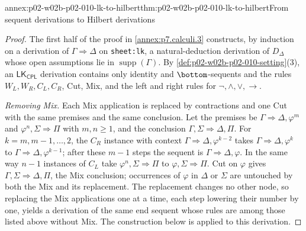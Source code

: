\begin{annexitem}{annex:p02-w02b-p02-010-lk-to-hilbert}{thm:p02-w02b-p02-010-lk-to-hilbert}{From sequent derivations to Hilbert derivations}
\begin{proof}
The first half of the proof in \cref{annex:p7.calculi.3} constructs, by
induction on a derivation of \(\Gamma\Rightarrow\Delta\) on
\texttt{sheet:\allowbreak lk}, a natural-deduction derivation of
\(D_\Delta\) whose open assumptions lie in \(\operatorname{supp}(\Gamma)\).
By \cref{def:p02-w02b-p02-010-setting}(3), an
\(\mathsf{LK}_{\mathsf{CPL}}\) derivation contains only identity and
\(\bottom\)-sequents and the rules \(W_L,W_R,C_L,C_R\), Cut, Mix, and the
left and right rules for \(\neg,\land,\lor,\to\).

\emph{Removing Mix.}  Each Mix application is replaced by contractions and
one Cut with the same premises and the same conclusion.  Let the premises be
\(\Gamma\Rightarrow\Delta,\varphi^{m}\) and \(\varphi^{n},\Sigma\Rightarrow\Pi\)
with \(m,n\ge 1\), and the conclusion \(\Gamma,\Sigma\Rightarrow\Delta,\Pi\).
For \(k=m,m-1,\ldots,2\), the \(C_R\) instance with context
\(\Gamma\Rightarrow\Delta,\varphi^{k-2}\) takes
\(\Gamma\Rightarrow\Delta,\varphi^{k}\) to
\(\Gamma\Rightarrow\Delta,\varphi^{k-1}\); after these \(m-1\) steps the
sequent is \(\Gamma\Rightarrow\Delta,\varphi\).  In the same way \(n-1\)
instances of \(C_L\) take \(\varphi^{n},\Sigma\Rightarrow\Pi\) to
\(\varphi,\Sigma\Rightarrow\Pi\).  Cut on \(\varphi\) gives
\(\Gamma,\Sigma\Rightarrow\Delta,\Pi\), the Mix conclusion; occurrences of
\(\varphi\) in \(\Delta\) or \(\Sigma\) are untouched by both the Mix and its
replacement.  The replacement changes no other node, so replacing the Mix
applications one at a time, each step lowering their number by one, yields a
derivation of the same end sequent whose rules are among those listed above
without Mix.  The construction below is applied to this derivation.


\end{proof}
\end{annexitem}

